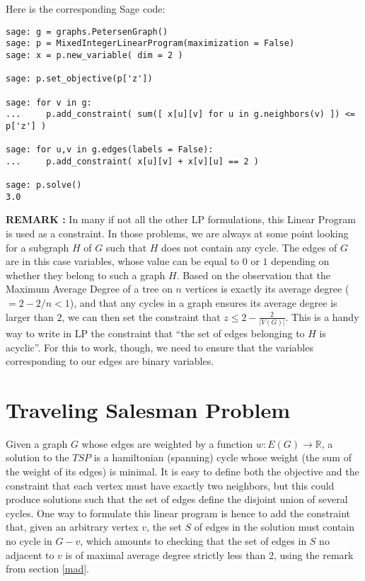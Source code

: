 Here is the corresponding Sage code:

\begin{lstlisting}
sage: g = graphs.PetersenGraph()
sage: p = MixedIntegerLinearProgram(maximization = False)
sage: x = p.new_variable( dim = 2 )

sage: p.set_objective(p['z'])

sage: for v in g:
...     p.add_constraint( sum([ x[u][v] for u in g.neighbors(v) ]) <= p['z'] )

sage: for u,v in g.edges(labels = False):
...     p.add_constraint( x[u][v] + x[v][u] == 2 )

sage: p.solve()
3.0
\end{lstlisting}

{\bf REMARK : } In many if not all the other LP formulations, this Linear Program is used as a constraint. In those problems, we are always at some point looking for a subgraph $H$ of $G$ such that $H$ does not contain any cycle. The edges of $G$ are in this case variables, whose value can be equal to $0$ or $1$ depending on whether they belong to such a graph $H$. Based on the observation that the Maximum Average Degree of a tree on $n$ vertices is exactly its average degree ($=2-2/n<1$), and that any cycles in a graph ensures its average degree is larger than $2$, we can then set the constraint that $z\leq 2-\frac 2 {|V(G)|}$. This is a handy way to write in LP the constraint that ``the set of edges belonging to $H$ is acyclic''. For this to work, though, we need to ensure that the variables corresponding to our edges are binary variables.



\section{Traveling Salesman Problem}
Given a graph $G$ whose edges are weighted by a function $w:E(G)\rightarrow \mathbb R$, a solution to the $TSP$ is a hamiltonian (spanning) cycle whose weight (the sum of the weight of its edges) is minimal. It is easy to define both the objective and the constraint that each vertex must have exactly two neighbors, but this could produce solutions such that the set of edges define the disjoint union of several cycles. One way to formulate this linear program is hence to add the constraint that, given an arbitrary vertex $v$, the set $S$ of edges in the solution must contain no cycle in $G-v$, which amounts to checking that the set of edges in $S$ no adjacent to $v$ is of maximal average degree strictly less than 2, using the remark from section \ref{mad}.

